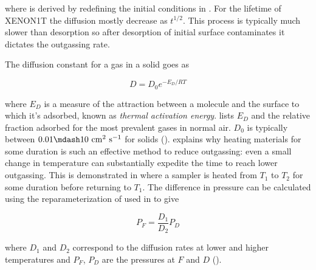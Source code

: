 \noindent where  is derived by redefining the initial conditions in
.  For the lifetime of XENON1T the diffusion mostly decrease as
$t^{1/2}$.  This process is typically much slower than desorption so after desorption of initial surface
contaminates it dictates the outgassing rate.

The diffusion constant for a gas in a solid goes as

\begin{equation}
D = D_0 e^{-E_D/RT}
\label{eq:electron_lifetime_model_outgassing_sources_diffusion_temp}
\end{equation}

\noindent where $E_D$ is a measure of the attraction between a molecule and the surface to which it's adsorbed, known as \textit{thermal
activation energy}.   lists $E_D$ and the relative fraction
adsorbed for the most prevalent gases in normal air.  $D_0$ is typically between $0.01 \mdash 10\ \mathrm{cm^{2}\ s^{-1}}$ for
solids ().   explains
why heating materials for some duration is such an effective method to reduce outgassing: even a small change in temperature can
substantially expedite the time to reach lower outgassing.  This is demonstrated in
 where a sampler is heated from $T_1$ to $T_2$ for some duration
before returning to $T_1$.  The difference in pressure can be calculated using the reparameterization of
 used in  to
give

\begin{equation}
P_F = \frac{D_1}{D_2} P_D
\end{equation}

\noindent where $D_1$ and $D_2$ correspond to the diffusion rates at lower and higher temperatures and $P_F$, $P_D$ are the pressures at
$F$ and $D$ ().

